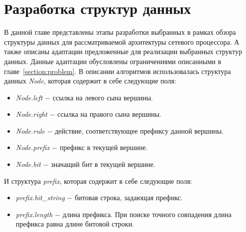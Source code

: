 \documentclass[conference]{IEEEtran}
\begin{document}
\section{Разработка структур данных}
        \label{section:trees}
        В данной главе представлены этапы разработки выбранных в рамках обзора структуры данных для рассматриваемой архитектуры сетевого процессора.
        А также описаны адаптации предложенные для реализации выбранных структур данных. Данные адаптации обусловлены ограничениями описанными в главе~\ref{section:problem}.
        В описании алгоритмов использовалась структура данных \emph{Node}, которая содержит в себе следующие поля:
        \begin{itemize}
            \item \emph{Node.left} $-$ ссылка на левого сына вершины.
            \item \emph{Node.right} $-$ ссылка на правого сына вершины.
            \item \emph{Node.rule} $-$ действие, соответствующее префиксу данной вершины.
            \item \emph{Node.prefix} $-$ префикс в текущей вершине.
            \item \emph{Node.bit} $-$ значащий бит в текущей вершине.
        \end{itemize}
        И структура \emph{prefix}, которая содержит в себе следующие поля:
        \begin{itemize}
            \item \emph{prefix.bit\_string} $-$ битовая строка, задающая префикс.
            \item \emph{prefix.length} $-$ длина префикса. При поиске точного совпадения длина префикса равна длине битовой строки.
        \end{itemize}
\end{document}
